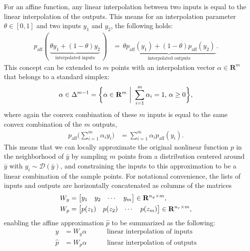 For an affine function, any linear interpolation between two inputs is equal to the linear interpolation of the outputs. This means for an interpolation parameter $\theta \in [0, 1]$ and two inputs $y_1$ and $y_2$, the following holds:
\begin{align}
    p_\text{aff}(\,\underbrace{\theta y_1 + (1-\theta)y_2}_\text{interpolated inputs}\,) &= \underbrace{\,\theta p_\text{aff}(y_1) + (1 - \theta) p_\text{aff}(y_2)\,}_\text{interpolated outputs}.
\end{align}
This concept can be extended to $m$ points with an interpolation vector $\alpha \in \mathbf{R}^m$ that belongs to a standard simplex:
\begin{align}
    \alpha \in \Delta^{m-1} = \biggl\{  \alpha \in \mathbf{R}^{m} \,\,\bigg|\,\, \sum_{i=1}^m \alpha_i =1,\, \alpha \geq 0\biggl\},
\end{align}
where again the convex combination of these $m$ inputs is equal to the same convex combination of the $m$ outputs,
\begin{align}
    p_\text{aff}\bigg({\sum_{i=1}^m\alpha_i y_i}\bigg) &= {\sum_{i=1}^m \alpha_i p_\text{aff}(y_i)}.
\end{align}
This means that we can locally approximate the original nonlinear function $p$ in the neighborhood of $\bar{y}$ by sampling $m$ points from a distribution centered around $\bar{y}$ with $y_i \sim \mathcal{D}(\bar{y})$, and constraining the inputs to this approximation to be a linear combination of the sample points.  For notational convenience, the lists of inputs and outputs are horizontally concatenated as columns of the matrices 
\begin{align}
    W_y &= \begin{bmatrix}
        y_1 & y_2 & \cdots & y_m
    \end{bmatrix} \in \mathbf{R}^{n_y \times m}, \\
    W_p &= \begin{bmatrix}
        p(z_1) & p(z_2) & \cdots & p(z_m)
    \end{bmatrix} \in \mathbf{R}^{n_r \times m}, 
\end{align}
enabling the affine approximation $\hat{p}$ to be summarized as the following:
\begin{align}
    y &= W_y \alpha \quad \quad \quad  \text{linear interpolation of inputs}\\ 
    \hat{p} &= W_p \alpha \quad \quad \quad  \text{linear interpolation of outputs}\label{btb:blend1}
\end{align}


